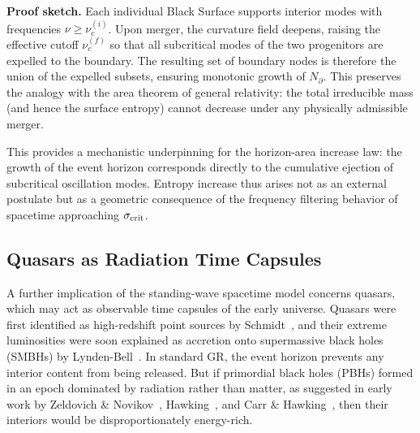 \documentclass[12pt]{article}
\begin{document}
\noindent\textbf{Proof sketch.} 
Each individual Black Surface supports interior modes with frequencies \(\nu \ge \nu_c^{(i)}\).  Upon merger, the curvature field deepens, raising the effective cutoff \(\nu_c^{(f)}\) so that all subcritical modes of the two progenitors are expelled to the boundary.  The resulting set of boundary nodes is therefore the union of the expelled subsets, ensuring monotonic growth of \(N_{\partial}\).  This preserves the analogy with the area theorem of general relativity: the total irreducible mass (and hence the surface entropy) cannot decrease under any physically admissible merger.

\medskip
This provides a mechanistic underpinning for the horizon-area increase law: the growth of the event horizon corresponds directly to the cumulative ejection of subcritical oscillation modes.  Entropy increase thus arises not as an external postulate but as a geometric consequence of the frequency filtering behavior of spacetime approaching \(\sigma_{\rm crit}\).

\subsection{Quasars as Radiation Time Capsules}

A further implication of the standing-wave spacetime model concerns quasars, which may act as observable time capsules of the early universe. Quasars were first identified as high-redshift point sources by Schmidt~\cite{schmidt1963quasar}, and their extreme luminosities were soon explained as accretion onto supermassive black holes (SMBHs) by Lynden-Bell~\cite{lyndenbell1969}. In standard GR, the event horizon prevents any interior content from being released. But if primordial black holes (PBHs) formed in an epoch dominated by radiation rather than matter, as suggested in early work by Zeldovich \& Novikov~\cite{zeldovich1967pbh}, Hawking~\cite{hawking1971pbh}, and Carr \& Hawking~\cite{carrhawking1974}, then their interiors would be disproportionately energy-rich.
\end{document}
